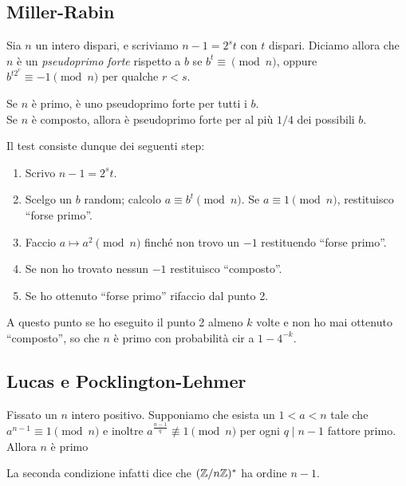 \documentclass[a4paper]{book}
\begin{document}
    \subsection{Miller-Rabin}
    \begin{definition}
        Sia $n$ un intero dispari, e scriviamo $n-1=2^st$ con $t$ dispari. Diciamo allora che $n$ è un \emph{pseudoprimo forte} rispetto a $b$ se $b^t\equiv\pmod n$, oppure $b^{t2^r}\equiv-1\pmod n$ per qualche $r<s$.
    \end{definition}

    \begin{proposition}
        Se $n$ è primo, è uno pseudoprimo forte per tutti i $b$.\\
        Se $n$ è composto, allora è pseudoprimo forte per al più $1/4$ dei possibili $b$.
    \end{proposition}

    Il test consiste dunque dei seguenti step:
    \begin{enumerate}
        \item Scrivo $n-1=2^st$.
        \item Scelgo un $b$ random; calcolo $a\equiv b^t\pmod n$. Se $a\equiv1\pmod n$, restituisco ``forse primo''.
        \item Faccio $a\mapsto a^2\pmod n$ finché non trovo un $-1$ restituendo ``forse primo''.
        \item Se non ho trovato nessun $-1$ restituisco ``composto''.
        \item Se ho ottenuto ``forse primo'' rifaccio dal punto 2.
    \end{enumerate}

    A questo punto se ho eseguito il punto 2 almeno $k$ volte e non ho mai ottenuto ``composto'', so che $n$ è primo con probabilità cir a $1-4^{-k}$.

    \subsection{Lucas e Pocklington-Lehmer}

    \begin{proposition}
        Fissato un $n$ intero positivo. Supponiamo che esista un $1<a<n$ tale che $a^{n-1}\equiv1\pmod n$ e inoltre $a^{\frac{n-1}{q}}\not\equiv1\pmod n$ per ogni $q\mid n-1$ fattore primo. Allora $n$ è primo
    \end{proposition}
    La seconda condizione infatti dice che $(\mathbb{Z}/n\mathbb{Z})^\ast$ ha ordine $n-1$.
\end{document}
